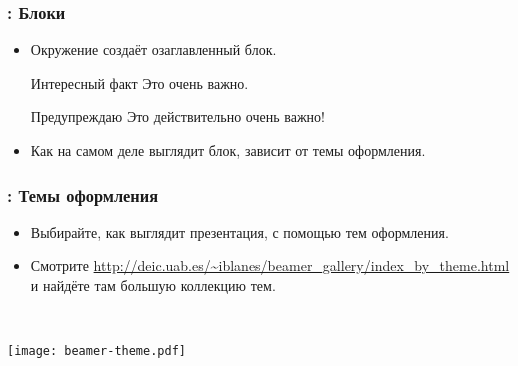 \documentclass[usenames,dvipsnames]{beamer}
\begin{document}
\begin{frame}[fragile]
\frametitle{\insertsection: Блоки}
\begin{itemize}
\item Окружение  создаёт озаглавленный блок.
\begin{exampletwouptiny}
\begin{block}{Интересный факт}
Это очень важно.
\end{block}

\begin{alertblock}{Предупреждаю}
Это действительно очень важно!
\end{alertblock}
\end{exampletwouptiny}
\item Как на самом деле выглядит блок, зависит от темы оформления.
\end{itemize}
\end{frame}

\begin{frame}[fragile]
\frametitle{\insertsection: Темы оформления}
\vspace{-3ex}
\begin{itemize}
\item Выбирайте, как выглядит презентация, с помощью тем оформления.
\item Смотрите \url{http://deic.uab.es/~iblanes/beamer_gallery/index_by_theme.html}
и найдёте там большую коллекцию тем.
\end{itemize}
\begin{minipage}{0.56\linewidth}
\end{minipage}~~%
\begin{minipage}{0.5\linewidth}
\texttt{[image: beamer-theme.pdf]}
\end{minipage}
\end{frame}
\end{document}

